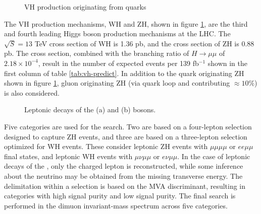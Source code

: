 \begin{figure}[htpb]
  \centering
  \caption{VH production originating from quarks}
    \label{fig:vh-prod}
\end{figure}

The VH production mechanisms, WH and ZH, shown in figure \ref{fig:vh-prod}, are the third and fourth leading Higgs boson production mechanisms at the LHC. The $\sqrt{S}=13$ TeV cross section of WH is 1.36 pb, and the cross section of ZH is 0.88 pb. The cross section, combined with the branching ratio of $H\to\mu\mu$ of $2.18\times10^{-4}$, result in the number of expected events per 139 fb$^{-1}$ shown in the first column of table \ref{tab:vh-predict}. In addition to the quark originating ZH shown in figure \ref{fig:vh-prod}, gluon originating ZH (via quark loop and contributing $\approx10\%$) is also considered.


\begin{figure}[h!]
\captionsetup[subfigure]{position=b}
\centering
{}
\hspace{3em}
  \caption{Leptonic decays of the \W (a) and \Z (b) bosons.}
  \label{fig:vh-decay}
\end{figure}

Five categories are used for the search.
Two are based on a four-lepton selection designed to capture ZH events, and three are based on a three-lepton selection optimized for WH events.
These consider leptonic ZH events with $\mu\mu\mu\mu$ or $ee\mu\mu$ final states, and leptonic WH events with $\mu\nu\mu\mu$ or $e\nu\mu\mu$.
In the case of leptonic decays of the \W, only the charged lepton is reconstructed, while some inference about the neutrino may be obtained from the missing transverse energy.
The delimitation within a selection is based on the MVA discriminant, resulting in categories with high signal purity and low signal purity.
The final search is performed in the dimuon invariant-mass spectrum across five categories.

